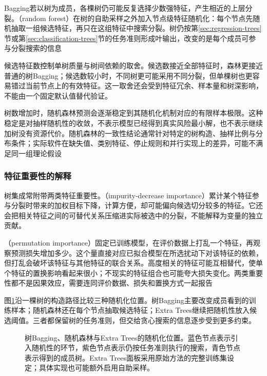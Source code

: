 Bagging若以树为成员，各棵树仍可能反复选择少数强特征，产生相近的上层分裂。（random forest）在树的自助采样之外加入节点级特征随机化：每个节点先随机抽取一组候选特征，再只在这组特征中搜索分裂。树仍按第\ref{sec:regression-trees}节或第\ref{sec:classification-trees}节的任务准则形成叶输出，改变的是每个成员可参与分裂搜索的信息

候选特征数控制单树质量与树间依赖的取舍。候选数接近全部特征时，森林更接近普通的树Bagging；候选数较小时，不同树更可能采用不同分裂，但单棵树也更容易错过当前节点上的有效特征。这一取舍还会受到特征冗余、样本量和树深影响，不能由一个固定默认值替代验证。

树数增加时，随机森林预测会逐渐稳定到其随机化机制对应的有限样本极限。这种稳定是对抽样随机性的收敛，不表示模型已经得到真实风险最小解，也不表示继续加树没有资源代价。随机森林的一致性结论通常针对特定的树构造、抽样比例与分布条件；实际软件在缺失值、类别特征、停止规则和并行实现上的差异，可能不满足同一组理论假设

\subsubsection{特征重要性的解释}

树集成常附带两类特征重要性。（impurity-decrease importance）累计某个特征参与分裂时带来的加权目标下降，计算方便，却可能偏向候选切分较多的特征。它还会把相关特征之间的可替代关系压缩进实际被选中的分裂，不能解释为变量的独立贡献。

（permutation importance）固定已训练模型，在评价数据上打乱一个特征，再观察预测损失增加多少。这个量直接对应已拟合模型在所选扰动下对该特征的依赖，但打乱会破坏该特征与其他特征的联合关系。高度相关的特征可能互相替代，使单个特征的置换影响看起来很小；不现实的特征组合也可能夸大损失变化。两类重要性都不是因果效应，需要连同评价数据、损失和置换方式一起报告

图\ref{fig:ensemble-tree-randomization}沿一棵树的构造路径比较三种随机化位置。树Bagging主要改变成员看到的训练样本；随机森林还在每个节点抽取候选特征；Extra Trees继续把随机性放入候选阈值。三者都保留树的任务准则，但交给贪心搜索的信息逐步受到更多约束。

\begin{figure}[htbp]
  \centering
  
  \caption{树Bagging、随机森林与Extra Trees的随机化位置。蓝色节点表示引入随机性的环节，紫色节点表示仍按任务准则执行的搜索，青色节点表示得到的成员树。Extra Trees面板采用原始方法的完整训练集设定；具体实现也可能额外启用自助采样。}
  \label{fig:ensemble-tree-randomization}
\end{figure}

